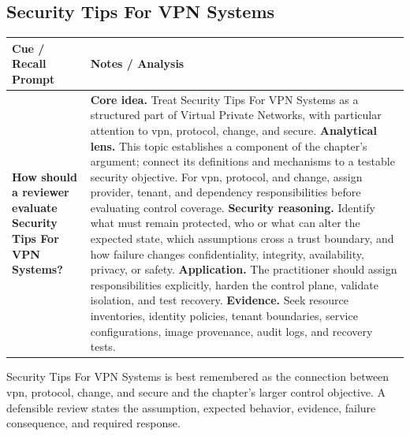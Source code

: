 \documentclass[11pt]{article}
\newcommand{\CornellHeader}{%
\rowcolor{Navy}\color{white}\bfseries Cue / Recall Prompt & \color{white}\bfseries Notes / Analysis\\\hline}
\newcommand{\CornellRow}[2]{%
\cellcolor{CueGray}\RaggedRight\textbf{#1} & \RaggedRight #2\\\hline}
\begin{document}
\subsection*{Security Tips For VPN Systems}
\begin{longtable}{>{\RaggedRight\arraybackslash}p{}|>{\RaggedRight\arraybackslash}p{}}
\CornellHeader
\CornellRow{How should a reviewer evaluate Security Tips For VPN Systems?}{\textbf{Core idea.} Treat Security Tips For VPN Systems as a structured part of Virtual Private Networks, with particular attention to vpn, protocol, change, and secure. \textbf{Analytical lens.} This topic establishes a component of the chapter's argument; connect its definitions and mechanisms to a testable security objective. For vpn, protocol, and change, assign provider, tenant, and dependency responsibilities before evaluating control coverage. \textbf{Security reasoning.} Identify what must remain protected, who or what can alter the expected state, which assumptions cross a trust boundary, and how failure changes confidentiality, integrity, availability, privacy, or safety. \textbf{Application.} The practitioner should assign responsibilities explicitly, harden the control plane, validate isolation, and test recovery. \textbf{Evidence.} Seek resource inventories, identity policies, tenant boundaries, service configurations, image provenance, audit logs, and recovery tests.}
\end{longtable}
\begin{topicsummary}
Security Tips For VPN Systems is best remembered as the connection between vpn, protocol, change, and secure and the chapter's larger control objective. A defensible review states the assumption, expected behavior, evidence, failure consequence, and required response.
\end{topicsummary}
\end{document}
